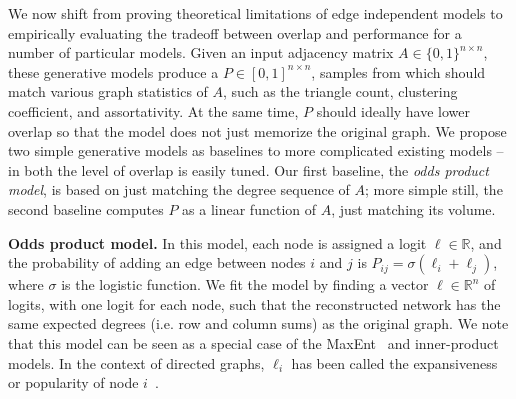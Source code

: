 


We now shift from proving theoretical limitations of edge independent models to empirically evaluating the tradeoff between overlap and performance for a number of particular models.
 Given an input adjacency matrix $A \in \{0,1\}^{n \times n}$, these generative models produce a $P \in [0,1]^{n \times n}$, samples from which should match various graph statistics of $A$, such as the triangle count, clustering coefficient, and assortativity. At the same time, $P$ should ideally have lower overlap so that the model does not %
 just memorize the original graph.
We propose two simple generative models as baselines to more complicated existing models -- in both the level of overlap is easily tuned. %
Our first baseline, the \emph{odds product model}, is based on just matching the degree sequence of $A$; more simple still, the second baseline computes $P$ as a linear function of $A$, just matching its volume.

\noindent\textbf{Odds product model.}
In this model, each node is assigned a logit $\ell \in \mathbb{R}$, and the probability of adding an edge between nodes $i$ and $j$ is $P_{ij} = \sigma(\ell_i + \ell_j)$, where $\sigma$ is the logistic function. We fit the model by finding a vector $\bm{\ell} \in \mathbb{R}^n$ of logits, with one logit for each node, such that the reconstructed network has the same expected degrees (i.e. row and column sums) as the original graph.
We note that this model can be seen as a special case of the MaxEnt~\cite{de2011maximum} and inner-product~\cite{ma2020universal,hoff2003random,hoff2005bilinear} models. In the context of directed graphs, $\bm{\ell}_i$ has been called the expansiveness or popularity of node $i$~\cite{goldenberg2010survey}.

